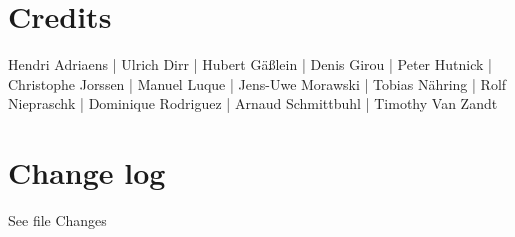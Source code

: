 \section{Credits}
{Hendri Adriaens | } 
{Ulrich Dirr | } 
{Hubert G\"a\ss lein |}
{Denis Girou | } 
{Peter Hutnick | } 
{Christophe Jorssen | } 
{Manuel Luque | } 
{Jens-Uwe Morawski |}
{Tobias N\"ahring |}
{Rolf Niepraschk |}
{Dominique Rodriguez |}
{Arnaud Schmittbuhl |}
{Timothy Van Zandt}



\nocite{*}




\section{Change log}

See file Changes


%
